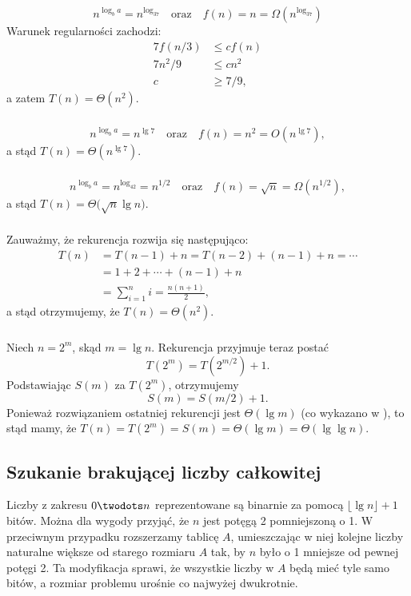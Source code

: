 \subsubsection{} %
\[
	n^{\log_ba} = n^{\log_37} \quad\text{oraz}\quad f(n) = n = \Omega(n^{\log_37})
\]
Warunek regularności zachodzi:
\begin{align*}
	7f(n/3) &\le cf(n) \\
	7n^2\!/9 &\le cn^2 \\
	c &\ge 7/9,
\end{align*}
a zatem $T(n)=\Theta(n^2)$.

\subsubsection{} %
\[
	n^{\log_ba} = n^{\lg7} \quad\text{oraz}\quad f(n) = n^2 = O(n^{\lg7}),
\]
a stąd $T(n)=\Theta(n^{\lg 7})$.

\subsubsection{} %
\[
	n^{\log_ba} = n^{\log_42} = n^{1/2} \quad\text{oraz}\quad f(n) = \sqrt{n} = \Omega(n^{1/2}),
\]
a stąd $T(n)=\Theta\bigl(\!\sqrt{n}\lg n\bigr)$.

\subsubsection{} %
Zauważmy, że rekurencja rozwija się następująco:
\begin{align*}
	T(n) &= T(n-1)+n = T(n-2)+(n-1)+n = \cdots \\
	&= 1+2+\cdots+(n-1)+n \\
	&= \sum_{i=1}^ni = \frac{n(n+1)}{2},
\end{align*}
a stąd otrzymujemy, że $T(n)=\Theta(n^2)$.

\subsubsection{} %
Niech $n=2^m$, skąd $m=\lg n$. Rekurencja przyjmuje teraz postać
\[
	T(2^m) = T(2^{m/2})+1.
\]
Podstawiając $S(m)$ za $T(2^m)$, otrzymujemy
\[
	S(m) = S(m/2)+1.
\]
Ponieważ rozwiązaniem ostatniej rekurencji jest $\Theta(\lg m)$ (co wykazano w ), to stąd mamy, że $T(n)=T(2^m)=S(m)=\Theta(\lg m)=\Theta(\lg\lg n)$.

\subsection{Szukanie brakującej liczby całkowitej} %
Liczby z zakresu $0\twodots n$ reprezentowane są binarnie za pomocą $\lfloor\lg n\rfloor+1$ bitów. Można dla wygody przyjąć, że $n$ jest potęgą 2 pomniejszoną o 1. W przeciwnym przypadku rozszerzamy tablicę $A$, umieszczając w niej kolejne liczby naturalne większe od starego rozmiaru $A$ tak, by $n$ było o 1 mniejsze od pewnej potęgi 2. Ta modyfikacja sprawi, że wszystkie liczby w $A$ będą mieć tyle samo bitów, a rozmiar problemu urośnie co najwyżej dwukrotnie.

